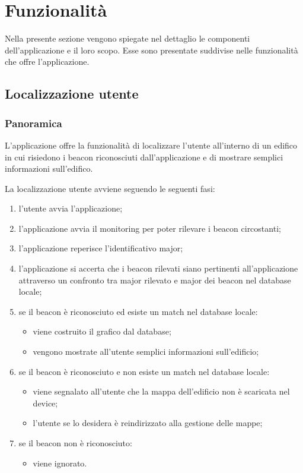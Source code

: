 \documentclass[../ManualeSviluppatore.tex]{subfiles}
\begin{document}
\section{Funzionalità}
	Nella presente sezione vengono spiegate nel dettaglio le componenti dell'applicazione e il loro scopo. Esse sono presentate suddivise nelle funzionalità che offre l'applicazione.

	\subsection{Localizzazione utente}
		
		\subsubsection{Panoramica}
			L'applicazione offre la funzionalità di localizzare l'utente all'interno di un edifico in cui risiedono i beacon riconosciuti dall'applicazione e di mostrare semplici informazioni sull'edifico.
			
			La localizzazione utente avviene seguendo le seguenti fasi:
			\begin{enumerate}
				\item l'utente avvia l'applicazione;
				\item l'applicazione avvia il monitoring per poter rilevare i beacon circostanti;
				\item l'applicazione reperisce l'identificativo major;
				\item l'applicazione si accerta che i beacon rilevati siano pertinenti all'applicazione attraverso un confronto tra major rilevato e major dei beacon nel database locale;
				\item se il beacon è riconosciuto ed esiste un match nel database locale:
					\begin{itemize}
						\item viene costruito il grafico dal database;
						\item vengono mostrate all'utente semplici informazioni sull'edificio;
					\end{itemize}
				\item se il beacon è riconosciuto e non esiste un match nel database locale:
					\begin{itemize}
						\item viene segnalato all'utente che la mappa dell'edificio non è scaricata nel device;
						\item l'utente se lo desidera è reindirizzato alla gestione delle mappe;
					\end{itemize}
				\item se il beacon non è riconosciuto:
					\begin{itemize}
						\item viene ignorato.
					\end{itemize}
			\end{enumerate}
			
\end{document}
